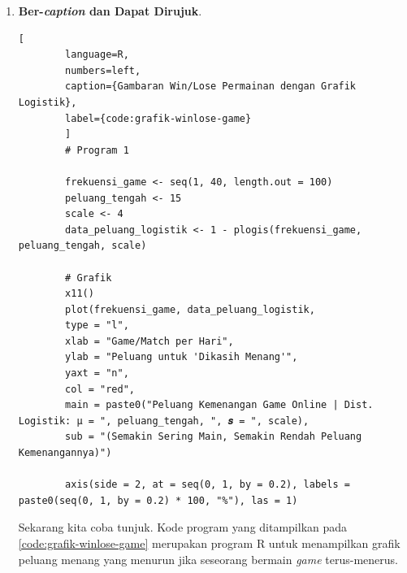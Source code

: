 \begin{enumerate}[]
\begin{lstlisting}[language=R, numbers=left]
        frekuensi_game <- seq(1, 40, length.out = 100)
        peluang_tengah <- 15
        scale <- 4
        data_peluang_logistik <- 1 - plogis(frekuensi_game, peluang_tengah, scale)
        
        # Grafik
        x11()
        plot(frekuensi_game, data_peluang_logistik,
        type = "l",
        xlab = "Game/Match per Hari",
        ylab = "Peluang untuk 'Dikasih Menang'",
        yaxt = "n",
        col = "red",
        main = paste0("Peluang Kemenangan Game Online | Dist. Logistik: μ = ", peluang_tengah, ", 𝒔 = ", scale),
        sub = "(Semakin Sering Main, Semakin Rendah Peluang Kemenangannya)")
        
        axis(side = 2, at = seq(0, 1, by = 0.2), labels = paste0(seq(0, 1, by = 0.2) * 100, "%"), las = 1)
    \end{lstlisting}
    
    \item \textbf{Ber-\textit{caption} dan Dapat Dirujuk}. 
    
    \begin{lstlisting}[
        language=R, 
        numbers=left,
        caption={Gambaran Win/Lose Permainan dengan Grafik Logistik},
        label={code:grafik-winlose-game}
        ]
        # Program 1
        
        frekuensi_game <- seq(1, 40, length.out = 100)
        peluang_tengah <- 15
        scale <- 4
        data_peluang_logistik <- 1 - plogis(frekuensi_game, peluang_tengah, scale)
        
        # Grafik
        x11()
        plot(frekuensi_game, data_peluang_logistik,
        type = "l",
        xlab = "Game/Match per Hari",
        ylab = "Peluang untuk 'Dikasih Menang'",
        yaxt = "n",
        col = "red",
        main = paste0("Peluang Kemenangan Game Online | Dist. Logistik: μ = ", peluang_tengah, ", 𝒔 = ", scale),
        sub = "(Semakin Sering Main, Semakin Rendah Peluang Kemenangannya)")
        
        axis(side = 2, at = seq(0, 1, by = 0.2), labels = paste0(seq(0, 1, by = 0.2) * 100, "%"), las = 1)
    \end{lstlisting}
    
    Sekarang kita coba tunjuk. Kode program yang ditampilkan pada \autoref{code:grafik-winlose-game} merupakan program R untuk menampilkan grafik peluang menang yang menurun jika seseorang bermain \textit{game} terus-menerus.
\end{enumerate}


